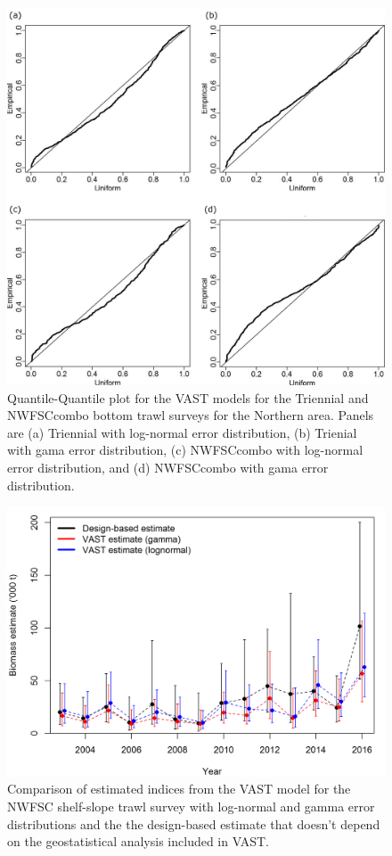 \documentclass[12pt,]{article}
\begin{document}
\begin{figure}[htbp]
\centering
\includegraphics{Figures/Q-Q_plots_VAST.png}
\caption{Quantile-Quantile plot for the VAST models for the Triennial
and NWFSCcombo bottom trawl surveys for the Northern area. Panels are
(a) Triennial with log-normal error distribution, (b) Trienial with gama
error distribution, (c) NWFSCcombo with log-normal error distribution,
and (d) NWFSCcombo with gama error distribution.\label{fig:VAST_QQ}}
\end{figure}

\begin{figure}[htbp]
\centering
\includegraphics{Figures/VAST_NWFSCcombo/NWFSC_index_compare.png}
\caption{Comparison of estimated indices from the VAST model for the
NWFSC shelf-slope trawl survey with log-normal and gamma error
distributions and the the design-based estimate that doesn't depend on
the geostatistical analysis included in
VAST.\label{fig:VAST_compare_NWFSCcombo}}
\end{figure}
\end{document}
